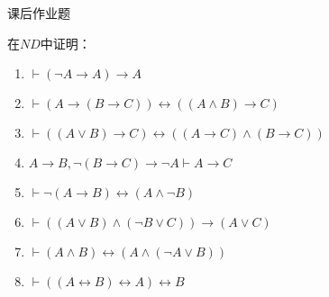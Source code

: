 \documentclass{article}
\begin{document}
\begin{CJK*}{UTF8}{gbsn}
  课后作业题

  在$ND$中证明：

  \begin{enumerate}
    \item $\vdash (\lnot A\to A)\to A$
    \item $\vdash (A\to (B\to C))\leftrightarrow ((A\land B)\to C)$
    \item $\vdash ((A\lor B)\to C)\leftrightarrow((A\to C)\land (B\to C))$
    \item $A\to B, \lnot(B\to C)\to \lnot A\vdash A\to C$
    \item $\vdash \lnot (A\to B)\leftrightarrow (A\land \lnot B)$
    \item $\vdash ((A\lor B)\land (\lnot B\lor C))\to (A\lor C)$
    \item $\vdash (A\land B)\leftrightarrow (A\land (\lnot A\lor B))$
    \item $\vdash ((A\leftrightarrow B)\leftrightarrow A)\leftrightarrow B$
  \end{enumerate}
\end{CJK*}
\end{document}
